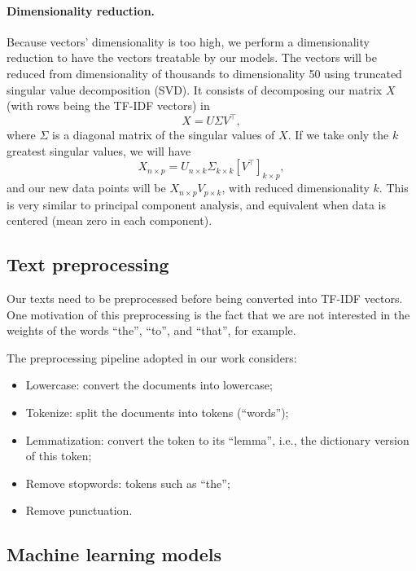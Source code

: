 \documentclass[twocolumn]{article}
\begin{document}
                  \paragraph{Dimensionality reduction.} Because vectors' dimensionality is too high, we perform a dimensionality reduction to have the vectors treatable by our models. The vectors will be reduced from dimensionality of thousands to dimensionality 50 using truncated singular value decomposition (SVD). It consists of decomposing our matrix $X$ (with rows being the TF-IDF vectors) in
                  \[X = U \Sigma V^\intercal,\]                  
                  where $\Sigma$ is a diagonal matrix of the singular values of $X$. If we take only the $k$ greatest singular values, we will have
                  \[X_{n \times p} = U_{n \times k} \Sigma_{k \times k} \left[V^\intercal\right]_{k \times p},\]                  
                  and our new data points will be $X_{n \times p} V_{p \times k}$, with reduced dimensionality $k$. This is very similar to principal component analysis, and equivalent when data is centered (mean zero in each component).

            \subsection{Text preprocessing}

                  Our texts need to be preprocessed before being converted into TF-IDF vectors. One motivation of this preprocessing is the fact that we are not interested in the weights of the words ``the'', ``to'', and ``that'', for example.

                  The preprocessing pipeline adopted in our work considers:
                  \begin{itemize}
                  \item Lowercase: convert the documents into lowercase;
                  \item Tokenize: split the documents into tokens (``words'');
                  \item Lemmatization: convert the token to its ``lemma'', i.e., the dictionary version of this token;
                  \item Remove stopwords: tokens such as ``the'';
                  \item Remove punctuation.
                  \end{itemize}

            \subsection{Machine learning models}
                  \label{sec:models}
\end{document}
